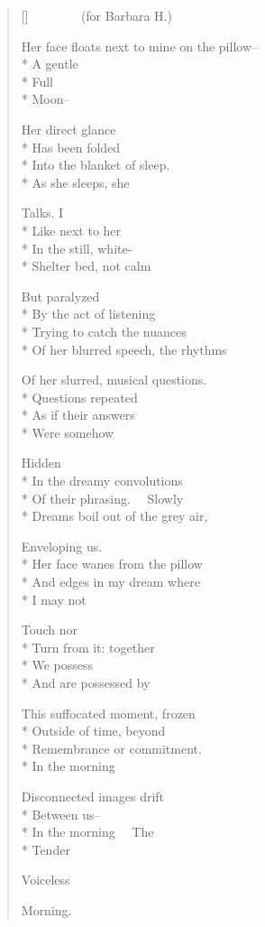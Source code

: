 \label{ch:poem_from_a_restless_sleep}
\settowidth{\versewidth}{Her face floats next to mine on the pillow--}
\begin{verse}[\versewidth]
         (for Barbara H.)

Her face floats next to mine on the pillow--\\*
A gentle\\*
Full\\*
Moon--

Her direct glance\\*
Has been folded\\*
Into the blanket of sleep.\\*
As she sleeps, she

Talks. I\\*
Like next to her\\*
In the still, white-\\*
Shelter bed, not calm

But paralyzed\\*
By the act of listening\\*
Trying to catch the nuances\\*
Of her blurred speech, the rhythms

Of her slurred, musical questions.\\*
Questions repeated\\*
As if their answers\\*
Were somehow

Hidden\\*
In the dreamy convolutions\\*
Of their phrasing.   Slowly\\*
Dreams boil out of the grey air,

Enveloping us.\\*
Her face wanes from the pillow\\*
And edges in my dream where\\*
I may not

Touch nor\\*
Turn from it: together\\*
We possess\\*
And are possessed by


This suffocated moment, frozen\\*
Outside of time, beyond\\*
Remembrance or commitment.\\*
In the morning

Disconnected images drift\\*
Between us--\\*
In the morning   The\\*
Tender

Voiceless

Morning.
\end{verse}
